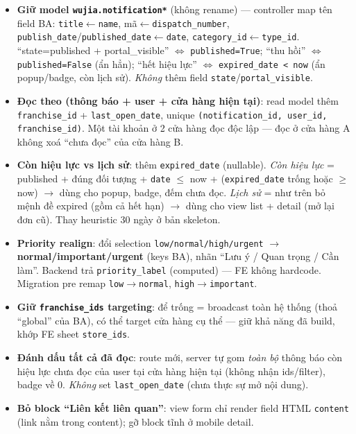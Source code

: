 \begin{itemize}
\item \textbf{Giữ model \texttt{wujia.notification*}} (không rename) --- controller map tên field BA:
      \texttt{title}$\leftarrow$\texttt{name}, mã$\leftarrow$\texttt{dispatch\_number},
      \texttt{publish\_date}/\texttt{published\_date}$\leftarrow$\texttt{date},
      \texttt{category\_id}$\leftarrow$\texttt{type\_id}. ``state=published + portal\_visible''
      $\Leftrightarrow$ \texttt{published=True}; ``thu hồi'' $\Leftrightarrow$ \texttt{published=False}
      (ẩn hẳn); ``hết hiệu lực'' $\Leftrightarrow$ \texttt{expired\_date < now} (ẩn popup/badge, còn
      lịch sử). \emph{Không} thêm field \texttt{state}/\texttt{portal\_visible}.
\item \textbf{Đọc theo (thông báo + user + cửa hàng hiện tại)}: read model thêm
      \texttt{franchise\_id} + \texttt{last\_open\_date}, unique
      \texttt{(notification\_id, user\_id, franchise\_id)}. Một tài khoản ở 2 cửa hàng đọc độc lập
      --- đọc ở cửa hàng A không xoá ``chưa đọc'' của cửa hàng B.
\item \textbf{Còn hiệu lực vs lịch sử}: thêm \texttt{expired\_date} (nullable). \emph{Còn hiệu lực}
      = published + đúng đối tượng + \texttt{date} $\le$ now + (\texttt{expired\_date} trống hoặc
      $\ge$ now) $\rightarrow$ dùng cho popup, badge, đếm chưa đọc. \emph{Lịch sử} = như trên bỏ mệnh
      đề expired (gồm cả hết hạn) $\rightarrow$ dùng cho view list + detail (mở lại đơn cũ). Thay
      heuristic 30 ngày ở bản skeleton.
\item \textbf{Priority realign}: đổi selection \texttt{low/normal/high/urgent} $\rightarrow$
      \textbf{normal/important/urgent} (keys BA), nhãn ``Lưu ý / Quan trọng / Cần làm''. Backend trả
      \texttt{priority\_label} (computed) --- FE không hardcode. Migration pre remap
      \texttt{low}$\rightarrow$\texttt{normal}, \texttt{high}$\rightarrow$\texttt{important}.
\item \textbf{Giữ \texttt{franchise\_ids} targeting}: để trống = broadcast toàn hệ thống (thoả
      ``global'' của BA), có thể target cửa hàng cụ thể --- giữ khả năng đã build, khớp FE sheet
      \texttt{store\_ids}.
\item \textbf{Đánh dấu tất cả đã đọc}: route mới, server tự gom \emph{toàn bộ} thông báo còn hiệu
      lực chưa đọc của user tại cửa hàng hiện tại (không nhận ids/filter), badge về 0. \emph{Không}
      set \texttt{last\_open\_date} (chưa thực sự mở nội dung).
\item \textbf{Bỏ block ``Liên kết liên quan''}: view form chỉ render field HTML \texttt{content}
      (link nằm trong content); gỡ block tĩnh ở mobile detail.
\end{itemize}

